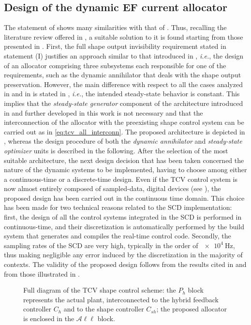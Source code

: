 \subsection{Design of the dynamic EF current allocator}
\label{sec:tcvall_design}
The statement of  shows many similarities with that of . Thus, recalling the literature review offered in , a suitable solution to it is found starting from those presented in . First, the full shape output invisibility requirement stated in statement (I) justifies an approach similar to that introduced in \cite{cristofaro_output_2014}, \emph{i.e.}, the design of an allocator comprising three subsystems each responsible for one of the requirements, such as the dynamic annihilator that deals with the shape output preservation. However, the main difference with respect to all the cases analyzed in  and in \cite{cristofaro_output_2014} is stated in , \emph{i.e.}, the intended steady-state behavior is constant. This implies that the \emph{steady-state generator} component of the architecture introduced in \cite{cristofaro_output_2014} and further developed in this work is not necessary and that the interconnection of the allocator with the preexisting shape control system can be carried out as in \eqref{eq:tcv_all_interconn}. The proposed architecture is depicted in , whereas the design procedure of both the \emph{dynamic annihilator} and \emph{steady-state optimizer} units is described in the following. After the selection of the most suitable architecture, the next design decision that has been taken concerned the nature of the dynamic systems to be implemented, having to choose among either a continuous-time or a discrete-time design. Even if the TCV control system is now almost entirely composed of sampled-data, digital devices (see ), the proposed design has been carried out in the continuous time domain. This choice has been made for two technical reasons related to the SCD implementation: first, the design of all the control systems integrated in the SCD is performed in continuous-time, and their discretization is automatically performed by the build system that generates and compiles the real-time control code. Secondly, the sampling rates of the SCD are very high, typically in the order of $\SI{e4}{\hertz}$, thus making negligible any error induced by the discretization in the majority of contexts. The validity of the proposed design follows from the results cited in  and from those illustrated in .
\begin{figure}[t]
  \centering
  
  \caption{Full diagram of the TCV shape control scheme: the $P_h$ block represents the actual plant, interconnected to the hybrid feedback controller $C_h$ and to the shape controller $C_{sh}$; the proposed allocator is enclosed in the $\mathcal{A}\ell\ell$ block.}
  \label{fig:tcvall}
\end{figure}


